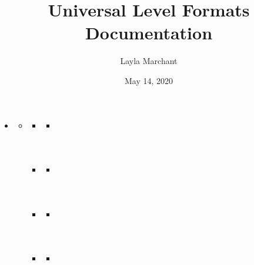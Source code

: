 \documentclass[letterpaper,10pt,english]{sphinxmanual}
\title{Universal Level Formats Documentation}
\date{May 14, 2020}
\author{Layla Marchant}
\begin{document}
\pagestyle{empty}
\sphinxmaketitle
\pagestyle{plain}
\sphinxtableofcontents
\pagestyle{normal}
\label{\detokenize{index::doc}}


\begin{sphinxShadowBox}
\begin{itemize}
\item {} 
\label{\detokenize{index:id1}}{\hyperref[\detokenize{index:universal-level-formats-documentation}]{}}
\begin{itemize}
\item {} 
\label{\detokenize{index:id2}}{\hyperref[\detokenize{index:level-format-classes}]{}}
\begin{itemize}
\item {} 
\label{\detokenize{index:id3}}{\hyperref[\detokenize{index:ulvl-jsl}]{}}
\begin{itemize}
\item {} 
\label{\detokenize{index:id4}}{\hyperref[\detokenize{index:ulvl-jsl-methods}]{}}

\end{itemize}

\item {} 
\label{\detokenize{index:id5}}{\hyperref[\detokenize{index:ulvl-ascl}]{}}
\begin{itemize}
\item {} 
\label{\detokenize{index:id6}}{\hyperref[\detokenize{index:ulvl-ascl-methods}]{}}

\end{itemize}

\item {} 
\label{\detokenize{index:id7}}{\hyperref[\detokenize{index:ulvl-ulx}]{}}
\begin{itemize}
\item {} 
\label{\detokenize{index:id8}}{\hyperref[\detokenize{index:ulvl-ulx-methods}]{}}

\end{itemize}

\item {} 
\label{\detokenize{index:id9}}{\hyperref[\detokenize{index:ulvl-tmx}]{}}
\begin{itemize}
\item {} 
\label{\detokenize{index:id10}}{\hyperref[\detokenize{index:ulvl-tmx-methods}]{}}


\end{itemize}
\end{itemize}
\end{itemize}
\end{itemize}
\end{sphinxShadowBox}
\end{document}
